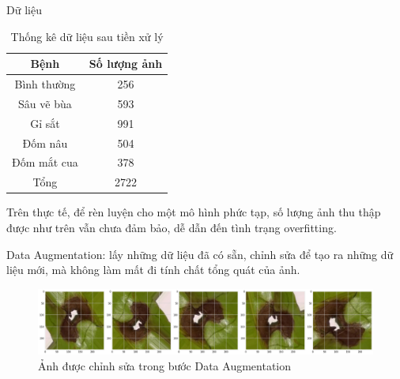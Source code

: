 \documentclass{beamer}
\begin{document}
\begin{frame}[allowframebreaks]{Dữ liệu}
	\framebreak

	\begin{table}[]
		\begin{tabular}{|c|c|}
		\hline
		Bệnh        & Số lượng ảnh \\ \hline
		Bình thường & 256          \\
		Sâu vẽ bùa  & 593          \\
		Gỉ sắt      & 991          \\
		Đốm nâu     & 504          \\
		Đốm mắt cua & 378          \\ \hline
		Tổng        & 2722         \\ \hline
		\end{tabular}

		\caption{Thống kê dữ liệu sau tiền xử lý}
	\end{table}


	\framebreak
	Trên thực tế, để rèn luyện cho một mô hình phức tạp, số lượng ảnh thu thập được như trên vẫn chưa đảm bảo, dễ dẫn đến tình trạng overfitting.

	\framebreak

	Data Augmentation: lấy những dữ liệu đã có sẵn, chỉnh sửa để tạo ra những dữ liệu mới, mà không làm mất đi tính chất tổng quát của ảnh.

	\begin{figure}[H]
		\includegraphics[scale=0.2]{images/image2}
		\caption{Ảnh được chỉnh sửa trong bước Data Augmentation}
	\end{figure}

\end{frame}
\end{document}
